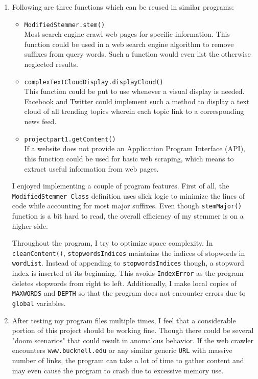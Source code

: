 \documentclass[12pt,letterpaper]{article}
\begin{document}
\renewcommand{\labelenumii}{\roman{enumii}.}
\begin{enumerate}
    \item Following are three functions which can be reused in similar programs:
        \begin{itemize}
            \item \texttt{ModifiedStemmer.stem()} \\
                Most search engine crawl web pages for specific information. This function could be used in a web search engine algorithm to remove suffixes from query words. Such a function would even list the otherwise neglected results.
            \item \texttt{complexTextCloudDisplay.displayCloud()} \\
               This function could be put to use whenever a visual display is needed. Facebook and Twitter could implement such a method to display a text cloud of all trending topics wherein each topic link to a corresponding news feed.
            \item \texttt{project\textunderscore part1.getContent()} \\
                If a website does not provide an Application Program Interface (API), this function could be used for basic web scraping, which means to extract useful information from web pages.
        \end{itemize}
        
        I enjoyed implementing a couple of program features. First of all, the \texttt{ModifiedStemmer Class} definition uses slick logic to minimize the lines of code while accounting for most major suffixes. Even though \texttt{stemMajor()} function is a bit hard to read, the overall efficiency of my stemmer is on a higher side.
        
        Throughout the program, I try to optimize space complexity. In \texttt{cleanContent()}, \texttt{stopwordsIndices} maintains the indices of stopwords in \texttt{wordList}. Instead of appending to \texttt{stopwordsIndices} though, a stopword index is inserted at its beginning. This avoids \texttt{IndexError} as the program deletes stopwords from right to left. Additionally, I make local copies of \texttt{MAX\textunderscore WORDS} and \texttt{DEPTH} so that the program does not encounter errors due to \texttt{global} variables.
        
    \item After testing my program files multiple times, I feel that a considerable portion of this project should be working fine. Though there could be several "doom scenarios" that could result in anomalous behavior. If the web crawler encounters \texttt{www.bucknell.edu} or any similar generic \texttt{URL} with massive number of links, the program can take a lot of time to gather content and may even cause the program to crash due to excessive memory use.
    

\end{enumerate}
\end{document}
